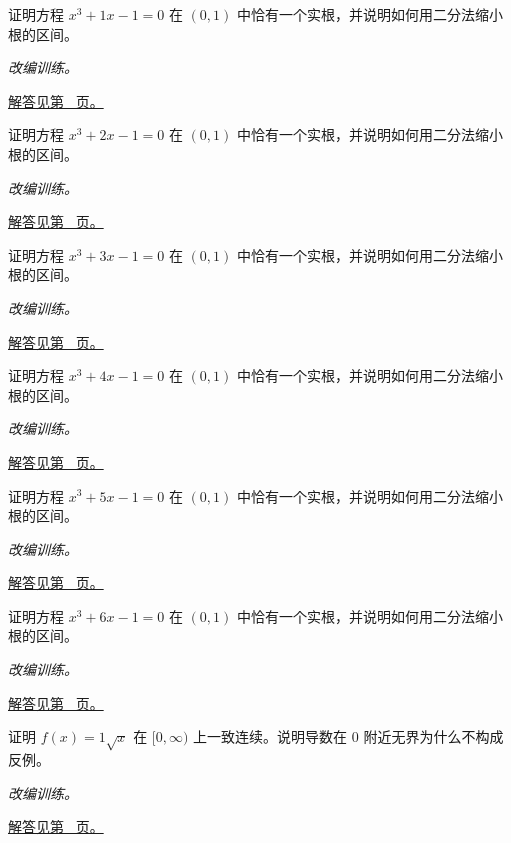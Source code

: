 \documentclass[12pt,fontset=fandol]{ctexart}
\begin{document}
\begin{example}[介值定理与单调性]\label{ex:c6q7}
证明方程 $x^3+1x-1=0$ 在 $(0,1)$ 中恰有一个实根，并说明如何用二分法缩小根的区间。
\par\textit{改编训练。}\par\hyperref[ans:c6q7]{解答见第~\pageref{ans:c6q7} 页。}
\end{example}
\begin{example}[介值定理与单调性]\label{ex:c6q8}
证明方程 $x^3+2x-1=0$ 在 $(0,1)$ 中恰有一个实根，并说明如何用二分法缩小根的区间。
\par\textit{改编训练。}\par\hyperref[ans:c6q8]{解答见第~\pageref{ans:c6q8} 页。}
\end{example}
\begin{example}[介值定理与单调性]\label{ex:c6q9}
证明方程 $x^3+3x-1=0$ 在 $(0,1)$ 中恰有一个实根，并说明如何用二分法缩小根的区间。
\par\textit{改编训练。}\par\hyperref[ans:c6q9]{解答见第~\pageref{ans:c6q9} 页。}
\end{example}
\begin{example}[介值定理与单调性]\label{ex:c6q10}
证明方程 $x^3+4x-1=0$ 在 $(0,1)$ 中恰有一个实根，并说明如何用二分法缩小根的区间。
\par\textit{改编训练。}\par\hyperref[ans:c6q10]{解答见第~\pageref{ans:c6q10} 页。}
\end{example}
\begin{example}[介值定理与单调性]\label{ex:c6q11}
证明方程 $x^3+5x-1=0$ 在 $(0,1)$ 中恰有一个实根，并说明如何用二分法缩小根的区间。
\par\textit{改编训练。}\par\hyperref[ans:c6q11]{解答见第~\pageref{ans:c6q11} 页。}
\end{example}
\begin{example}[介值定理与单调性]\label{ex:c6q12}
证明方程 $x^3+6x-1=0$ 在 $(0,1)$ 中恰有一个实根，并说明如何用二分法缩小根的区间。
\par\textit{改编训练。}\par\hyperref[ans:c6q12]{解答见第~\pageref{ans:c6q12} 页。}
\end{example}
\begin{example}[一致连续与无界导数]\label{ex:c6q13}
证明 $f(x)=1\sqrt x$ 在 $[0,\infty)$ 上一致连续。说明导数在 $0$ 附近无界为什么不构成反例。
\par\textit{改编训练。}\par\hyperref[ans:c6q13]{解答见第~\pageref{ans:c6q13} 页。}
\end{example}
\end{document}
